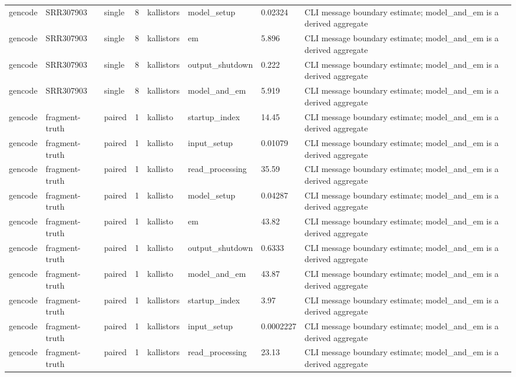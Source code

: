 \begin{tabular}{llllllll}
gencode & SRR307903 & single & 8 & kallistors & model\_setup & 0.02324 & CLI message boundary estimate; model\_and\_em is a derived aggregate \\
gencode & SRR307903 & single & 8 & kallistors & em & 5.896 & CLI message boundary estimate; model\_and\_em is a derived aggregate \\
gencode & SRR307903 & single & 8 & kallistors & output\_shutdown & 0.222 & CLI message boundary estimate; model\_and\_em is a derived aggregate \\
gencode & SRR307903 & single & 8 & kallistors & model\_and\_em & 5.919 & CLI message boundary estimate; model\_and\_em is a derived aggregate \\
gencode & fragment-truth & paired & 1 & kallisto & startup\_index & 14.45 & CLI message boundary estimate; model\_and\_em is a derived aggregate \\
gencode & fragment-truth & paired & 1 & kallisto & input\_setup & 0.01079 & CLI message boundary estimate; model\_and\_em is a derived aggregate \\
gencode & fragment-truth & paired & 1 & kallisto & read\_processing & 35.59 & CLI message boundary estimate; model\_and\_em is a derived aggregate \\
gencode & fragment-truth & paired & 1 & kallisto & model\_setup & 0.04287 & CLI message boundary estimate; model\_and\_em is a derived aggregate \\
gencode & fragment-truth & paired & 1 & kallisto & em & 43.82 & CLI message boundary estimate; model\_and\_em is a derived aggregate \\
gencode & fragment-truth & paired & 1 & kallisto & output\_shutdown & 0.6333 & CLI message boundary estimate; model\_and\_em is a derived aggregate \\
gencode & fragment-truth & paired & 1 & kallisto & model\_and\_em & 43.87 & CLI message boundary estimate; model\_and\_em is a derived aggregate \\
gencode & fragment-truth & paired & 1 & kallistors & startup\_index & 3.97 & CLI message boundary estimate; model\_and\_em is a derived aggregate \\
gencode & fragment-truth & paired & 1 & kallistors & input\_setup & 0.0002227 & CLI message boundary estimate; model\_and\_em is a derived aggregate \\
gencode & fragment-truth & paired & 1 & kallistors & read\_processing & 23.13 & CLI message boundary estimate; model\_and\_em is a derived aggregate \\

\end{tabular}
